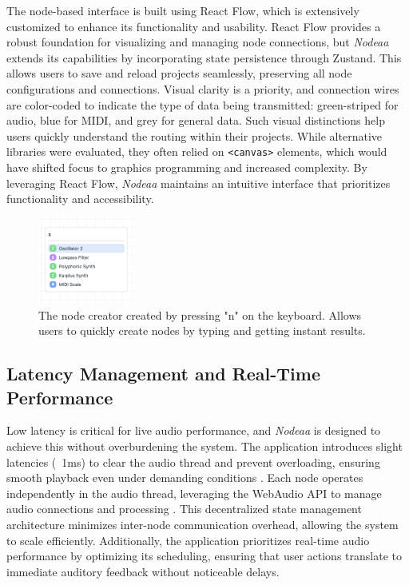 \documentclass[10pt,twocolumn]{article}
\begin{document}
The node-based interface is built using React Flow, which is extensively customized to enhance its functionality and usability. React Flow provides a robust foundation for visualizing and managing node connections, but \textit{Nodeaa} extends its capabilities by incorporating state persistence through Zustand. This allows users to save and reload projects seamlessly, preserving all node configurations and connections. Visual clarity is a priority, and connection wires are color-coded to indicate the type of data being transmitted: green-striped for audio, blue for MIDI, and grey for general data. Such visual distinctions help users quickly understand the routing within their projects. While alternative libraries were evaluated, they often relied on \texttt{<canvas>} elements, which would have shifted focus to graphics programming and increased complexity. By leveraging React Flow, \textit{Nodeaa} maintains an intuitive interface that prioritizes functionality and accessibility.

\begin{figure}[ht]
    \centering
    \includegraphics[width=0.28\textwidth]{images/nodeaacreator.png}
    \caption{The node creator created by pressing "n" on the keyboard. Allows users to quickly create nodes by typing and getting instant results.}
    \label{fig:nodeaacreator}
\end{figure}

\subsection{Latency Management and Real-Time Performance}
Low latency is critical for live audio performance, and \textit{Nodeaa} is designed to achieve this without overburdening the system. The application introduces slight latencies (~1ms) to clear the audio thread and prevent overloading, ensuring smooth playback even under demanding conditions \cite{buffa2024can}. Each node operates independently in the audio thread, leveraging the WebAudio API to manage audio connections and processing \cite{kleimola2015web}. This decentralized state management architecture minimizes inter-node communication overhead, allowing the system to scale efficiently. Additionally, the application prioritizes real-time audio performance by optimizing its scheduling, ensuring that user actions translate to immediate auditory feedback without noticeable delays.
\end{document}
